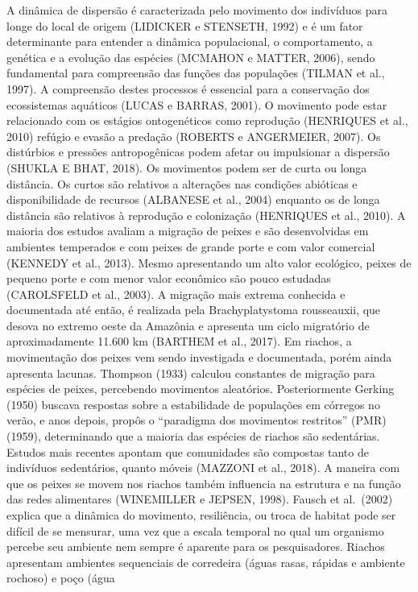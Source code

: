 \documentclass[
]{article}
\begin{document}
A dinâmica de dispersão é caracterizada pelo movimento dos indivíduos
para longe do local de origem (LIDICKER e STENSETH, 1992) e é um fator
determinante para entender a dinâmica populacional, o comportamento, a
genética e a evolução das espécies (MCMAHON e MATTER, 2006), sendo
fundamental para compreensão das funções das populações (TILMAN et al.,
1997). A compreensão destes processos é essencial para a conservação dos
ecossistemas aquáticos (LUCAS e BARRAS, 2001). O movimento pode estar
relacionado com os estágios ontogenéticos como reprodução (HENRIQUES et
al., 2010) refúgio e evasão a predação (ROBERTS e ANGERMEIER, 2007). Os
distúrbios e pressões antropogênicas podem afetar ou impulsionar a
dispersão (SHUKLA E BHAT, 2018). Os movimentos podem ser de curta ou
longa distância. Os curtos são relativos a alterações nas condições
abióticas e disponibilidade de recursos (ALBANESE et al., 2004) enquanto
os de longa distância são relativos à reprodução e colonização
(HENRIQUES et al., 2010). A maioria dos estudos avaliam a migração de
peixes e são desenvolvidas em ambientes temperados e com peixes de
grande porte e com valor comercial (KENNEDY et al., 2013). Mesmo
apresentando um alto valor ecológico, peixes de pequeno porte e com
menor valor econômico são pouco estudadas (CAROLSFELD et al., 2003). A
migração mais extrema conhecida e documentada até então, é realizada
pela Brachyplatystoma rousseauxii, que desova no extremo oeste da
Amazônia e apresenta um ciclo migratório de aproximadamente 11.600 km
(BARTHEM et al., 2017). Em riachos, a movimentação dos peixes vem sendo
investigada e documentada, porém ainda apresenta lacunas. Thompson
(1933) calculou constantes de migração para espécies de peixes,
percebendo movimentos aleatórios. Posteriormente Gerking (1950) buscava
respostas sobre a estabilidade de populações em córregos no verão, e
anos depois, propôs o ``paradigma dos movimentos restritos'' (PMR)
(1959), determinando que a maioria das espécies de riachos são
sedentárias. Estudos mais recentes apontam que comunidades são compostas
tanto de indivíduos sedentários, quanto móveis (MAZZONI et al., 2018). A
maneira com que os peixes se movem nos riachos também influencia na
estrutura e na função das redes alimentares (WINEMILLER e JEPSEN, 1998).
Fausch et al.~(2002) explica que a dinâmica do movimento, resiliência,
ou troca de habitat pode ser difícil de se mensurar, uma vez que a
escala temporal no qual um organismo percebe seu ambiente nem sempre é
aparente para os pesquisadores. Riachos apresentam ambientes sequenciais
de corredeira (águas rasas, rápidas e ambiente rochoso) e poço (água
\end{document}
